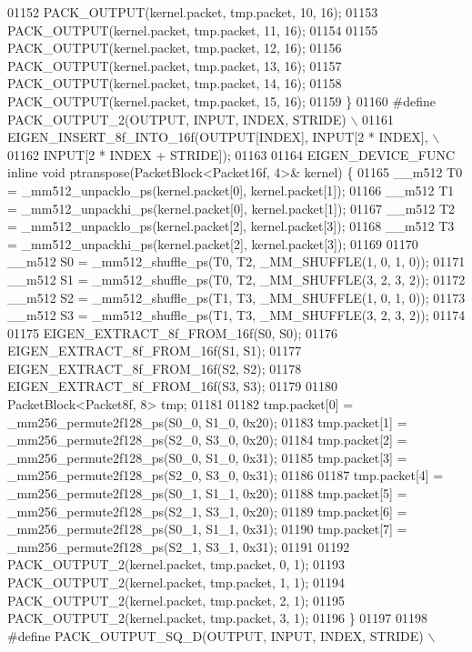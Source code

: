 \begin{DoxyCode}
01152   PACK\_OUTPUT(kernel.packet, tmp.packet, 10, 16);
01153   PACK\_OUTPUT(kernel.packet, tmp.packet, 11, 16);
01154 
01155   PACK\_OUTPUT(kernel.packet, tmp.packet, 12, 16);
01156   PACK\_OUTPUT(kernel.packet, tmp.packet, 13, 16);
01157   PACK\_OUTPUT(kernel.packet, tmp.packet, 14, 16);
01158   PACK\_OUTPUT(kernel.packet, tmp.packet, 15, 16);
01159 \}
01160 \textcolor{preprocessor}{#define PACK\_OUTPUT\_2(OUTPUT, INPUT, INDEX, STRIDE)         \(\backslash\)}
01161 \textcolor{preprocessor}{  EIGEN\_INSERT\_8f\_INTO\_16f(OUTPUT[INDEX], INPUT[2 * INDEX], \(\backslash\)}
01162 \textcolor{preprocessor}{                           INPUT[2 * INDEX + STRIDE]);}
01163 
01164 EIGEN\_DEVICE\_FUNC \textcolor{keyword}{inline} \textcolor{keywordtype}{void} ptranspose(PacketBlock<Packet16f, 4>& kernel) \{
01165   \_\_m512 T0 = \_mm512\_unpacklo\_ps(kernel.packet[0], kernel.packet[1]);
01166   \_\_m512 T1 = \_mm512\_unpackhi\_ps(kernel.packet[0], kernel.packet[1]);
01167   \_\_m512 T2 = \_mm512\_unpacklo\_ps(kernel.packet[2], kernel.packet[3]);
01168   \_\_m512 T3 = \_mm512\_unpackhi\_ps(kernel.packet[2], kernel.packet[3]);
01169 
01170   \_\_m512 S0 = \_mm512\_shuffle\_ps(T0, T2, \_MM\_SHUFFLE(1, 0, 1, 0));
01171   \_\_m512 S1 = \_mm512\_shuffle\_ps(T0, T2, \_MM\_SHUFFLE(3, 2, 3, 2));
01172   \_\_m512 S2 = \_mm512\_shuffle\_ps(T1, T3, \_MM\_SHUFFLE(1, 0, 1, 0));
01173   \_\_m512 S3 = \_mm512\_shuffle\_ps(T1, T3, \_MM\_SHUFFLE(3, 2, 3, 2));
01174 
01175   EIGEN\_EXTRACT\_8f\_FROM\_16f(S0, S0);
01176   EIGEN\_EXTRACT\_8f\_FROM\_16f(S1, S1);
01177   EIGEN\_EXTRACT\_8f\_FROM\_16f(S2, S2);
01178   EIGEN\_EXTRACT\_8f\_FROM\_16f(S3, S3);
01179 
01180   PacketBlock<Packet8f, 8> tmp;
01181 
01182   tmp.packet[0] = \_mm256\_permute2f128\_ps(S0\_0, S1\_0, 0x20);
01183   tmp.packet[1] = \_mm256\_permute2f128\_ps(S2\_0, S3\_0, 0x20);
01184   tmp.packet[2] = \_mm256\_permute2f128\_ps(S0\_0, S1\_0, 0x31);
01185   tmp.packet[3] = \_mm256\_permute2f128\_ps(S2\_0, S3\_0, 0x31);
01186 
01187   tmp.packet[4] = \_mm256\_permute2f128\_ps(S0\_1, S1\_1, 0x20);
01188   tmp.packet[5] = \_mm256\_permute2f128\_ps(S2\_1, S3\_1, 0x20);
01189   tmp.packet[6] = \_mm256\_permute2f128\_ps(S0\_1, S1\_1, 0x31);
01190   tmp.packet[7] = \_mm256\_permute2f128\_ps(S2\_1, S3\_1, 0x31);
01191 
01192   PACK\_OUTPUT\_2(kernel.packet, tmp.packet, 0, 1);
01193   PACK\_OUTPUT\_2(kernel.packet, tmp.packet, 1, 1);
01194   PACK\_OUTPUT\_2(kernel.packet, tmp.packet, 2, 1);
01195   PACK\_OUTPUT\_2(kernel.packet, tmp.packet, 3, 1);
01196 \}
01197 
01198 \textcolor{preprocessor}{#define PACK\_OUTPUT\_SQ\_D(OUTPUT, INPUT, INDEX, STRIDE)                \(\backslash\)}

\end{DoxyCode}

